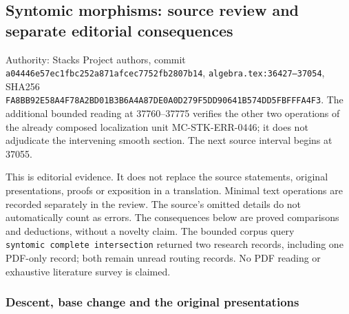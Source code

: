 \subsection{Syntomic morphisms: source review and separate editorial consequences}\label{algebra-proof-046-syntomic-morphisms-source-review-and-separate-editorial-consequences}

Authority: Stacks Project authors, commit \texttt{a044\allowbreak{}46e5\allowbreak{}7ec1\allowbreak{}fbc2\allowbreak{}52a8\allowbreak{}71af\allowbreak{}cec7\allowbreak{}752f\allowbreak{}b280\allowbreak{}7b14}, \texttt{algebra.\AlgebraIdentifierBreak{}tex:\AlgebraIdentifierBreak{}36427–\AlgebraIdentifierBreak{}37054}, SHA256 \texttt{FA8B\allowbreak{}B92E\allowbreak{}58A4\allowbreak{}F78A\allowbreak{}2BD0\allowbreak{}1B3B\allowbreak{}6A4A\allowbreak{}87DE\allowbreak{}0A0D\allowbreak{}279F\allowbreak{}5DD9\allowbreak{}0641\allowbreak{}B574\allowbreak{}DD5F\allowbreak{}BFFF\allowbreak{}A4F3}. The additional bounded reading at 37760--37775 verifies the other two operations of the already composed localization unit MC-\AlgebraIdentifierBreak{}STK-\AlgebraIdentifierBreak{}ERR-\AlgebraIdentifierBreak{}0446; it does not adjudicate the intervening smooth section. The next source interval begins at 37055.

This is editorial evidence. It does not replace the source statements, original presentations, proofs or exposition in a translation. Minimal text operations are recorded separately in the review. The source's omitted details do not automatically count as errors. The consequences below are proved comparisons and deductions, without a novelty claim. The bounded corpus query \texttt{syntomic\ complete\ intersection} returned two research records, including one PDF-only record; both remain unread routing records. No PDF reading or exhaustive literature survey is claimed.

\subsubsection{Descent, base change and the original presentations}\label{algebra-proof-046-descent-base-change-and-the-original-presentations}

